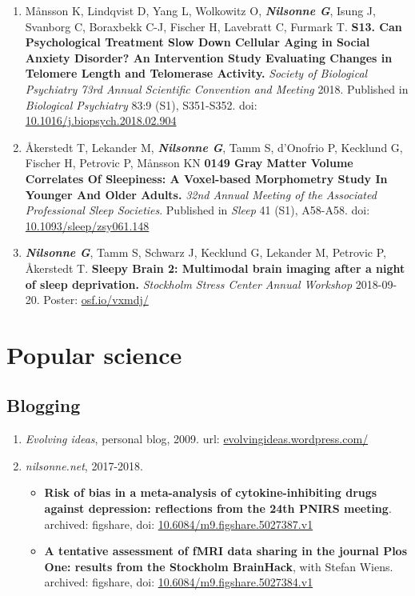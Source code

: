 \documentclass[10pt]{article}
\begin{document}
\begin{enumerate}[nolistsep]
pdf: \href{http://onlinelibrary.wiley.com/doi/10.1111/jsr.12446/epdf}{Journal of Sleep Research}, page 156, no. 206.
Poster: \href{http://www.stressforskning.su.se/polopoly_fs/1.302846.1476781538!/menu/standard/file/Torbj\%C3\%B6rn\%20september\%202016.pdf}{stressforskning.su.se}
\item Månsson K, Lindqvist D, Yang L, Wolkowitz O, \textbf{\textit{Nilsonne G}}, Isung J, Svanborg C, Boraxbekk C-J, Fischer H, Lavebratt C, Furmark T. \textbf{S13. Can Psychological Treatment Slow Down Cellular Aging in Social Anxiety Disorder? An Intervention Study Evaluating Changes in Telomere Length and Telomerase Activity.} \emph{Society of Biological Psychiatry 73rd Annual Scientific Convention and Meeting} 2018. Published in \emph{Biological Psychiatry} 83:9 (S1), S351-S352.
doi: \href{http:/doi.org/10.1016/j.biopsych.2018.02.904}{10.1016/j.biopsych.2018.02.904}
\item Åkerstedt T, Lekander M, \textbf{\textit{Nilsonne G}}, Tamm S, d’Onofrio P, Kecklund G, Fischer H, Petrovic P, Månsson KN \textbf{0149 Gray Matter Volume Correlates Of Sleepiness: A Voxel-based Morphometry Study In Younger And Older Adults.} \emph{32nd Annual Meeting of the Associated Professional Sleep Societies}. Published in \emph{Sleep} 41 (S1), A58-A58.
doi: \href{http:/doi.org/10.1093/sleep/zsy061.148}{10.1093/sleep/zsy061.148}
\item \textbf{\textit{Nilsonne G}}, Tamm S, Schwarz J, Kecklund G, Lekander M, Petrovic P, Åkerstedt T. \textbf{Sleepy Brain 2: Multimodal brain imaging after a night of sleep deprivation.} \emph{Stockholm Stress Center Annual Workshop} 2018-09-20.
Poster: \href{https://osf.io/vxmdj/}{osf.io/vxmdj/}
\end{enumerate}

\newpage
\section*{Popular science}
\subsection*{Blogging}
\begin{enumerate}[nolistsep]
\item \emph{Evolving ideas}, personal blog, 2009.
url: \href{https://evolvingideas.wordpress.com/}{evolvingideas.wordpress.com/}
\item \emph{nilsonne.net}, 2017-2018.
	\begin{itemize}[nolistsep]
      \item \textbf{Risk of bias in a meta-analysis of cytokine-inhibiting drugs against depression: reflections from the 24th PNIRS meeting}. archived: figshare, doi: \href{https://doi.org/10.6084/m9.figshare.5027387.v1}{10.6084/m9.figshare.5027387.v1}
      \item \textbf{A tentative assessment of fMRI data sharing in the journal Plos One: results from the Stockholm BrainHack}, with Stefan Wiens. archived: figshare, doi: \href{https://doi.org/10.6084/m9.figshare.5027384.v1}{10.6084/m9.figshare.5027384.v1}
	\end{itemize}
\end{enumerate}
\end{document}
